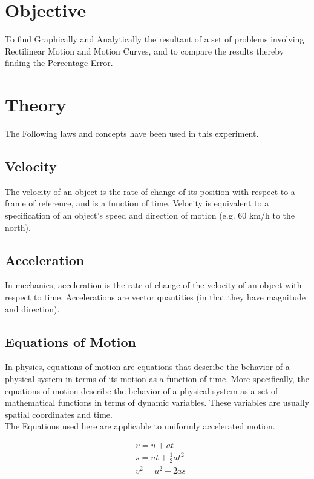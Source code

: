\documentclass[11pt]{article}
\begin{document}
	
\tableofcontents
\thispagestyle{empty}
\clearpage


\setcounter{page}{1}

\section{Objective}
To find Graphically and Analytically the resultant of a set of problems involving Rectilinear Motion and Motion Curves, and to compare the results thereby finding the Percentage Error.

\section{Theory}
The Following laws and concepts have been used in this experiment.

\subsection{Velocity}
The velocity of an object is the rate of change of its position with respect to a frame of reference, and is a function of time. Velocity is equivalent to a specification of an object's speed and direction of motion (e.g. 60 km/h to the north).

\subsection{Acceleration}
In mechanics, acceleration is the rate of change of the velocity of an object with respect to time. Accelerations are vector quantities (in that they have magnitude and direction).

\subsection{Equations of Motion}
In physics, equations of motion are equations that describe the behavior of a physical system in terms of its motion as a function of time. More specifically, the equations of motion describe the behavior of a physical system as a set of mathematical functions in terms of dynamic variables. These variables are usually spatial coordinates and time.\\

The Equations used here are applicable to uniformly accelerated motion. 

\begin{equation}
	\begin{aligned}
		&v=u+a t \\
		&s=u t+\frac{1}{2} a t^{2} \\
		&v^{2}=u^{2}+2 a s
	\end{aligned}
\end{equation}
\end{document}
